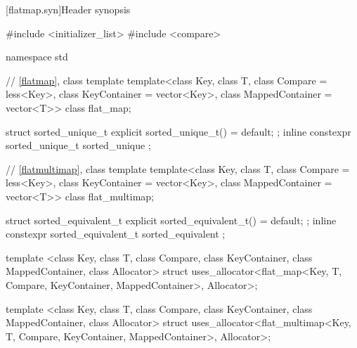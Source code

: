 \setcounter{subsection}{3}
\begin{addedblock}
[flatmap.syn]{Header  synopsis}%
%

\begin{codeblock}
#include <initializer_list>
#include <compare>

namespace std {
  // \ref{flatmap}, class template 
  template<class Key, class T, class Compare = less<Key>,
           class KeyContainer = vector<Key>, class MappedContainer = vector<T>>
    class flat_map;

  struct sorted_unique_t { explicit sorted_unique_t() = default; };
  inline constexpr sorted_unique_t sorted_unique {};

  // \ref{flatmultimap}, class template 
  template<class Key, class T, class Compare = less<Key>,
           class KeyContainer = vector<Key>, class MappedContainer = vector<T>>
    class flat_multimap;

  struct sorted_equivalent_t { explicit sorted_equivalent_t() = default; };
  inline constexpr sorted_equivalent_t sorted_equivalent {};

  template <class Key, class T, class Compare,
            class KeyContainer,
            class MappedContainer, class Allocator>
    struct uses_allocator<flat_map<Key, T, Compare, KeyContainer, MappedContainer>,
                          Allocator>;

  template <class Key, class T, class Compare,
            class KeyContainer,
            class MappedContainer, class Allocator>
    struct uses_allocator<flat_multimap<Key, T, Compare, KeyContainer, MappedContainer>,
                          Allocator>;

}
\end{codeblock}
\end{addedblock}

\noindent\makebox[\linewidth]{\rule{\textwidth}{0.4pt}}


